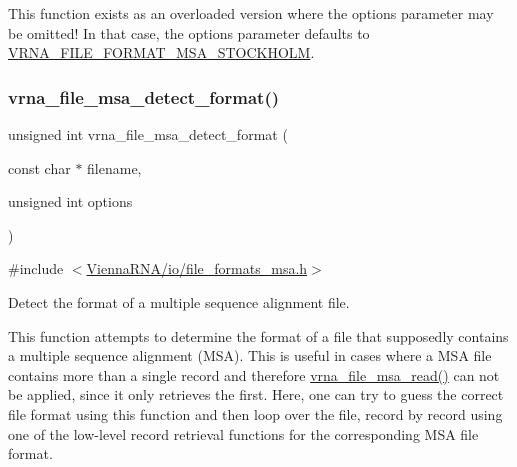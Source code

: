 This function exists as an overloaded version where the {\ttfamily options} parameter may be omitted! In that case, the {\ttfamily options} parameter defaults to \mbox{\hyperlink{group__file__formats__msa_ga62be992445cd8ab2ad7a8fded944338b}{V\+R\+N\+A\+\_\+\+F\+I\+L\+E\+\_\+\+F\+O\+R\+M\+A\+T\+\_\+\+M\+S\+A\+\_\+\+S\+T\+O\+C\+K\+H\+O\+LM}}. \mbox{\label{group__file__formats__msa_gade4fa8136ebb2d0f7eb3f8b59a8658e3}} 
\subsubsection{\texorpdfstring{vrna\_file\_msa\_detect\_format()}{vrna\_file\_msa\_detect\_format()}}
{\footnotesize\ttfamily unsigned int vrna\+\_\+file\+\_\+msa\+\_\+detect\+\_\+format (\begin{DoxyParamCaption}\item[{const char $\ast$}]{filename,  }\item[{unsigned int}]{options }\end{DoxyParamCaption})}



{\ttfamily \#include $<$\mbox{\hyperlink{io_2file__formats__msa_8h}{Vienna\+R\+N\+A/io/file\+\_\+formats\+\_\+msa.\+h}}$>$}



Detect the format of a multiple sequence alignment file. 

This function attempts to determine the format of a file that supposedly contains a multiple sequence alignment (M\+SA). This is useful in cases where a M\+SA file contains more than a single record and therefore \mbox{\hyperlink{group__file__formats__msa_gad02d5d12bda54611c915a1019323b7be}{vrna\+\_\+file\+\_\+msa\+\_\+read()}} can not be applied, since it only retrieves the first. Here, one can try to guess the correct file format using this function and then loop over the file, record by record using one of the low-\/level record retrieval functions for the corresponding M\+SA file format.

